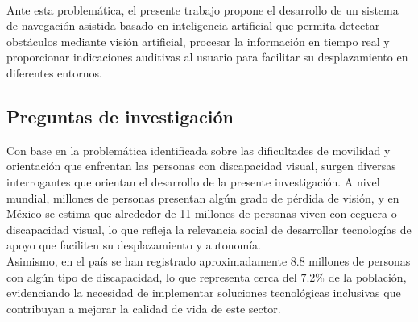 \\

Ante esta problemática, el presente trabajo propone el desarrollo de un sistema de navegación asistida basado en inteligencia artificial que permita detectar obstáculos mediante visión artificial, procesar la información en tiempo real y proporcionar indicaciones auditivas al usuario para facilitar su desplazamiento en diferentes entornos.

\subsection{Preguntas de investigación}
Con base en la problemática identificada sobre las dificultades de movilidad y orientación que enfrentan las personas con discapacidad visual, surgen diversas interrogantes que orientan el desarrollo de la presente investigación. A nivel mundial, millones de personas presentan algún grado de pérdida de visión, y en México se estima que alrededor de 11 millones de personas viven con ceguera o discapacidad visual, lo que refleja la relevancia social de desarrollar tecnologías de apoyo que faciliten su desplazamiento y autonomía.\\
Asimismo, en el país se han registrado aproximadamente 8.8 millones de personas con algún tipo de discapacidad, lo que representa cerca del $7.2\%$ de la población, evidenciando la necesidad de implementar soluciones tecnológicas inclusivas que contribuyan a mejorar la calidad de vida de este sector.
